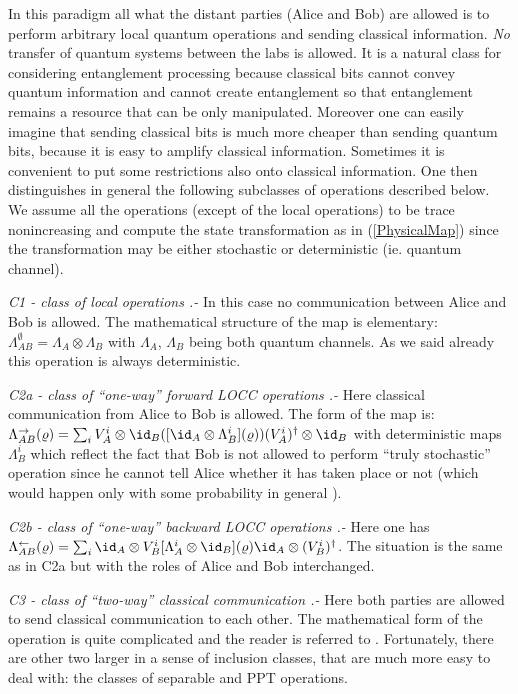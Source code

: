 \documentclass[rmp,12pt,preprint]{revtex4-2}
\begin{document}
In this paradigm all what the distant parties (Alice and Bob) are allowed is
to perform arbitrary local quantum operations and sending classical
information. {\it No} transfer of quantum systems between the labs is
allowed. It is a natural class for considering entanglement processing
because classical bits cannot convey quantum information and cannot
create entanglement so that entanglement remains a resource that can
be only manipulated. Moreover one can easily imagine that sending
classical bits is much more cheaper than sending quantum bits, because
it is easy to amplify classical information. Sometimes it is
convenient to put some restrictions also onto classical
information. One then distinguishes in general the following
subclasses of operations described below. We assume all the operations
(except of the local operations) to be trace nonincreasing and compute
the state transformation as in (\ref{PhysicalMap}) since the
transformation may be either stochastic or deterministic (ie. quantum
channel).

{\it C1 - class of local operations .-} In this case no communication
between Alice and Bob is allowed. The mathematical structure of the
map is elementary: $\Lambda_{AB}^{ \emptyset}= \Lambda_{A} \otimes
\Lambda_{B}$ with $\Lambda_{A}$, $\Lambda_{B}$ being both quantum
channels. As we said already this operation is always deterministic.

{\it C2a - class of ``one-way'' forward LOCC operations .-} Here
classical communication from Alice to Bob is allowed. The
form of the map is: $\Lambda_{AB}^{\rightarrow} (\varrho)=\sum_{i}
V^{i}_{A} \otimes
 \id_{B}(
[\id_{A} \otimes \Lambda_{B}^{i}](\varrho))(V^{i}_{A})^{\dagger}
\otimes \id_{B} $ with  deterministic maps $\Lambda_{B}^{i}$ which
reflect the fact that Bob is not allowed to perform ``truly
stochastic'' operation since he cannot tell Alice whether it has
taken place or not (which would happen only with some probability in
general ).

{\it C2b - class of ``one-way'' backward LOCC operations .-}
Here one has $\Lambda_{AB}^{\leftarrow} (\varrho)=\sum_{i}\id_{A}
\otimes V^{i}_{B} [ \Lambda_{A}^{i} \otimes \id_{B}](\varrho)\id_{A}
\otimes (V^{i}_{B})^{\dagger} $. The situation is the same as in C2a
but with the roles of Alice and Bob interchanged.


{\it C3 - class of ``two-way'' classical communication .-} Here both
parties are allowed to send classical communication to each other.
The mathematical form of the operation is quite complicated and the
reader is referred to \cite{DonaldHR2001}. Fortunately, there are
other two larger in a sense of inclusion classes, that are much more
easy to deal with: the classes of separable and PPT
operations.
\end{document}
